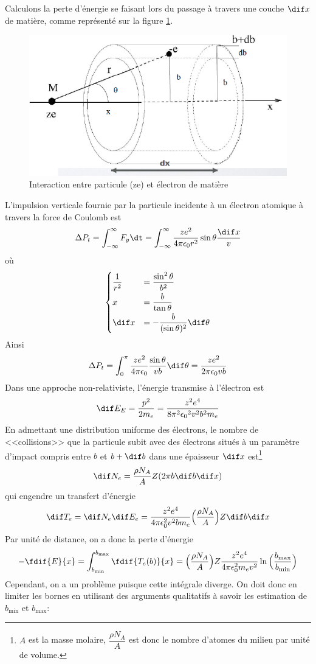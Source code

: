 Calculons la perte d'énergie se faisant lors du passage à travers une couche $\dif x$ de matière, comme représenté sur la figure \ref{fig:interraction_particule_matiere}.
\begin{figure}[ht]
    \centering
    \includegraphics[scale=0.60]{Images1/pertenrj.PNG}
    \caption{Interaction entre particule (ze) et électron de matière}
    \label{fig:interraction_particule_matiere}
\end{figure}
L'impulsion verticale fournie par la particule incidente à un électron atomique à travers la force de Coulomb est
\[
    \Delta P_t=\int_{-\infty}^\infty F_y \dt=\int_{-\infty}^\infty \dfrac{ze^2}{4\pi \epsilon_0 r^2} \sin{\theta}\dfrac{\dif x}{v}
\]
où
\[\begin{cases}
    \dfrac{1}{r^2} &= \dfrac{\sin^2\theta}{b^2} \\[2mm]
    x &= \dfrac{b}{\tan{\theta}} \\[2mm]
    \dif x &= -\dfrac{b}{(\sin{\theta})^2}\dif\theta
\end{cases}\]
Ainsi
\[
    \Delta P_t=\int_{0}^\pi \dfrac{ze^2}{4\pi \epsilon_0}\dfrac{\sin{\theta}}{vb}\dif\theta = \dfrac{ze^2}{2\pi \epsilon_0 vb}
\]
Dans une approche non-relativiste, l'énergie transmise à l'électron est
\[
    \dif E_E=\dfrac{p^2}{2m_e}=\dfrac{z^2e^4}{8\pi^2{\epsilon_0}^2v^2b^2m_e}
\]
En admettant une distribution uniforme des électrons, le nombre de <<collisions>> que la particule subit avec des électrons situés à un paramètre d'impact compris entre $b$ et $b+\dif b$ dans une épaisseur $\dif x$ est\footnote{$A$ est la masse molaire, $\dfrac{\rho N_A}{A}$ est donc le nombre d'atomes du milieu par unité de volume.}
\[
    \dif N_e=\dfrac{\rho N_A}{A}Z(2\pi b \dif b \dif x)
\]
qui engendre un transfert d'énergie
\[
    \dif T_e=\dif N_e\dif E_e=\dfrac{z^2e^4}{4\pi \epsilon_0^2v^2bm_e}\Big(\dfrac{\rho N_A}{A}\Big)Z \dif b \dif x
\]
Par unité de distance, on a donc la perte d'énergie
\[
    -\fdif{E}{x}=\int_{b_\text{min}}^{b_\text{max}} \fdif{T_e(b)}{x}=\Big(\dfrac{\rho N_A}{A}\Big)Z\dfrac{z^2e^4}{4\pi \epsilon_0^2m_ev^2}\ln{\Big(\dfrac{b_\text{max}}{b_\text{min}}\Big)}
\]
Cependant, on a un problème puisque cette intégrale diverge. On doit donc en limiter les bornes en utilisant des arguments qualitatifs à savoir les estimation de $b_\text{min}$ et $b_\text{max}$:

